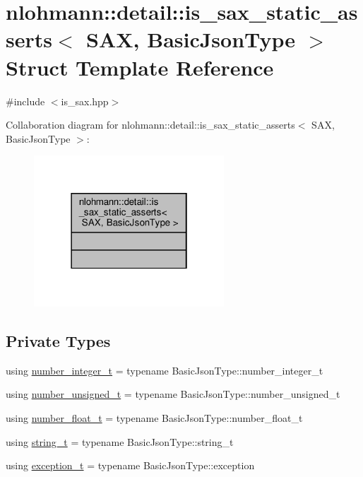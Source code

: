 \hypertarget{structnlohmann_1_1detail_1_1is__sax__static__asserts}{}\section{nlohmann\+:\+:detail\+:\+:is\+\_\+sax\+\_\+static\+\_\+asserts$<$ S\+AX, Basic\+Json\+Type $>$ Struct Template Reference}
\label{structnlohmann_1_1detail_1_1is__sax__static__asserts}


{\ttfamily \#include $<$is\+\_\+sax.\+hpp$>$}



Collaboration diagram for nlohmann\+:\+:detail\+:\+:is\+\_\+sax\+\_\+static\+\_\+asserts$<$ S\+AX, Basic\+Json\+Type $>$\+:
\nopagebreak
\begin{figure}[H]
\begin{center}
\leavevmode
\includegraphics[width=202pt]{structnlohmann_1_1detail_1_1is__sax__static__asserts__coll__graph}
\end{center}
\end{figure}
\subsection*{Private Types}
\begin{DoxyCompactItemize}
\item 
using \hyperlink{structnlohmann_1_1detail_1_1is__sax__static__asserts_a474adf99bf1eaa8292284fd3064c80fe}{number\+\_\+integer\+\_\+t} = typename Basic\+Json\+Type\+::number\+\_\+integer\+\_\+t
\item 
using \hyperlink{structnlohmann_1_1detail_1_1is__sax__static__asserts_af8733df7fcaebb25434285885db7f127}{number\+\_\+unsigned\+\_\+t} = typename Basic\+Json\+Type\+::number\+\_\+unsigned\+\_\+t
\item 
using \hyperlink{structnlohmann_1_1detail_1_1is__sax__static__asserts_a65d4be40c41ddc31fd2c3583d87d5faf}{number\+\_\+float\+\_\+t} = typename Basic\+Json\+Type\+::number\+\_\+float\+\_\+t
\item 
using \hyperlink{structnlohmann_1_1detail_1_1is__sax__static__asserts_a067c98d2145bb54d862f4794ac1287bb}{string\+\_\+t} = typename Basic\+Json\+Type\+::string\+\_\+t
\item 
using \hyperlink{structnlohmann_1_1detail_1_1is__sax__static__asserts_a34e1bc8ab7adbbab5f7d8c45a964020b}{exception\+\_\+t} = typename Basic\+Json\+Type\+::exception
\end{DoxyCompactItemize}


